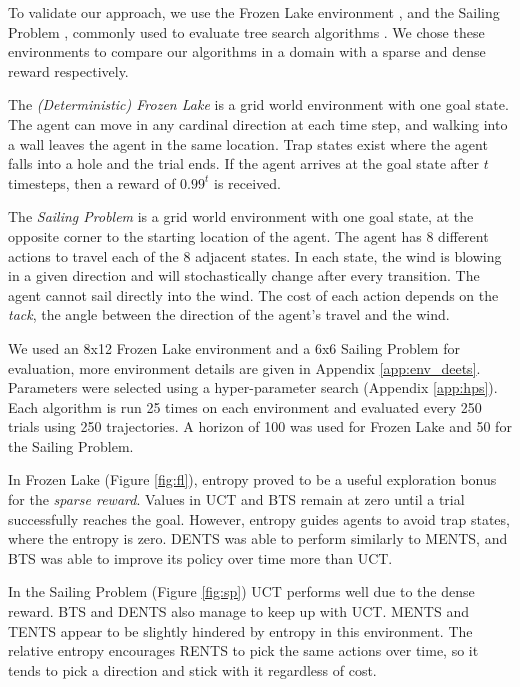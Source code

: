      \label{sec:gridworld_doms}
        To validate our approach, we use the Frozen Lake environment %
        , and the Sailing Problem %
        , commonly used to evaluate tree search algorithms %
        . We chose these environments to compare our algorithms in a domain with a sparse and dense reward respectively.
        
        The \emph{(Deterministic) Frozen Lake} is a grid world environment with one goal state. The agent can move in any cardinal direction at each time step, and walking into a wall leaves the agent in the same location. Trap states exist where the agent falls into a hole and the trial ends. If the agent arrives at the goal state after $t$ timesteps, then a reward of $0.99^t$ is received.
        
        The \emph{Sailing Problem} is a grid world environment with one goal state, at the opposite corner to the starting location of the agent. The agent has 8 different actions to travel each of the 8 adjacent states. In each state, the wind is blowing in a given direction and will stochastically change after every transition. The agent cannot sail directly into the wind. The cost of each action depends on the \textit{tack}, the angle between the direction of the agent's travel and the wind. %
    
    
        We used an 8x12 Frozen Lake environment and a 6x6 Sailing Problem for evaluation, more environment details are given in Appendix \ref{app:env_deets}. Parameters were selected using a hyper-parameter search (Appendix \ref{app:hps}). 
        Each algorithm is run 25 times on each environment and evaluated every 250 trials using 250 trajectories. 
        A horizon of 100 was used for Frozen Lake and 50 for the Sailing Problem.

        In Frozen Lake (Figure \ref{fig:fl}), entropy proved to be a useful exploration bonus for the \textit{sparse reward}. Values in UCT and BTS remain at zero until a trial successfully reaches the goal. However, entropy guides agents to avoid trap states, where the entropy is zero. DENTS was able to perform similarly to MENTS, and BTS was able to improve its policy over time more than UCT.

        In the Sailing Problem (Figure \ref{fig:sp}) UCT performs well due to the dense reward. BTS and DENTS also manage to keep up with UCT. MENTS and TENTS appear to be slightly hindered by entropy in this environment. The relative entropy encourages RENTS to pick the same actions over time, so it tends to pick a direction and stick with it regardless of cost.
        
